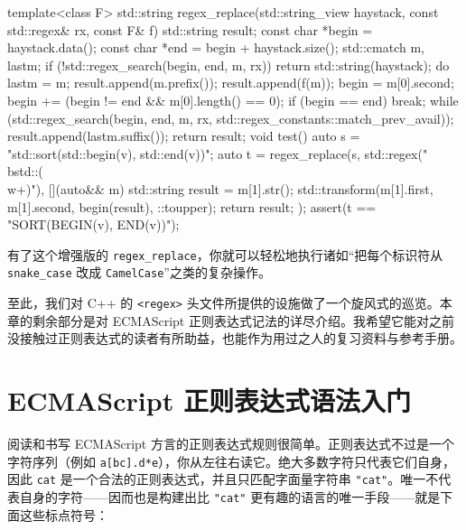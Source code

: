 \begin{codebox}[cpp]
    template<class F>
    std::string regex_replace(std::string_view haystack,
      const std::regex& rx, const F& f)
    {
      std::string result;
      const char *begin = haystack.data();
      const char *end = begin + haystack.size();
      std::cmatch m, lastm;
      if (!std::regex_search(begin, end, m, rx)) {
        return std::string(haystack);
      }
      do {
        lastm = m;
        result.append(m.prefix());
        result.append(f(m));
        begin = m[0].second;
        begin += (begin != end && m[0].length() == 0);
        if (begin == end) break;
      } while (std::regex_search(begin, end, m, rx,
        std::regex_constants::match_prev_avail));
      result.append(lastm.suffix());
      return result;
    }
    void test()
    {
      auto s = "std::sort(std::begin(v), std::end(v))";
      auto t = regex_replace(s, std::regex("\\bstd::(\\w+)"),
        [](auto&& m) {
          std::string result = m[1].str();
          std::transform(m[1].first, m[1].second,
          begin(result), ::toupper);
          return result;
        });
      assert(t == "SORT(BEGIN(v), END(v))");
    }
\end{codebox}

有了这个增强版的 \texttt{regex\_\allowbreak{}replace}，你就可以轻松地执行诸如“把每个标识符从 \texttt{snake\_\allowbreak{}case} 改成 \texttt{Camel\allowbreak{}Case}”之类的复杂操作。

至此，我们对 C++ 的 \texttt{<regex>\allowbreak{}} 头文件所提供的设施做了一个旋风式的巡览。本章的剩余部分是对 ECMAScript 正则表达式记法的详尽介绍。我希望它能对之前没接触过正则表达式的读者有所助益，也能作为用过之人的复习资料与参考手册。

\section{ECMAScript 正则表达式语法入门}

阅读和书写 ECMAScript 方言的正则表达式规则很简单。正则表达式不过是一个字符序列（例如 \texttt{a[bc].d*e}），你从左往右读它。绝大多数字符只代表它们自身，因此 \texttt{cat} 是一个合法的正则表达式，并且只匹配字面量字符串 \texttt{"cat"}。唯一不代表自身的字符——因而也是构建出比 \texttt{"cat"} 更有趣的语言的唯一手段——就是下面这些标点符号：


